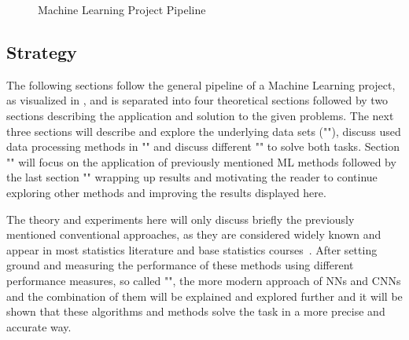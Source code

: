 \begin{figure}
    \vspace{-0.5cm}
    \centering
    \caption{Machine Learning Project Pipeline}
    \label{fig:pipeline}
\end{figure}
\subsection{Strategy}\label{subsec:strategy}
The following sections follow the general pipeline of a Machine Learning project, as visualized in , and is separated into four theoretical sections followed by two sections describing the application and solution to the given problems.
The next three sections will describe and explore the underlying data sets (""), discuss used data processing methods in  "" and discuss different "" to solve both tasks.
Section "" will focus on the application of previously mentioned ML methods followed by the last section "" wrapping up results and motivating the reader to continue exploring other methods and improving the results displayed here.

The theory and experiments here will only discuss briefly the previously mentioned conventional approaches, as they are considered widely known and appear in most statistics literature and base statistics courses~\cite{LinReg1, LinReg2, handsOn}.
After setting ground and measuring the performance of these methods using different performance measures, so called "", the more modern approach of NNs and CNNs and the combination of them will be explained and explored further and it will be shown that these algorithms and methods solve the task in a more precise and accurate way.
